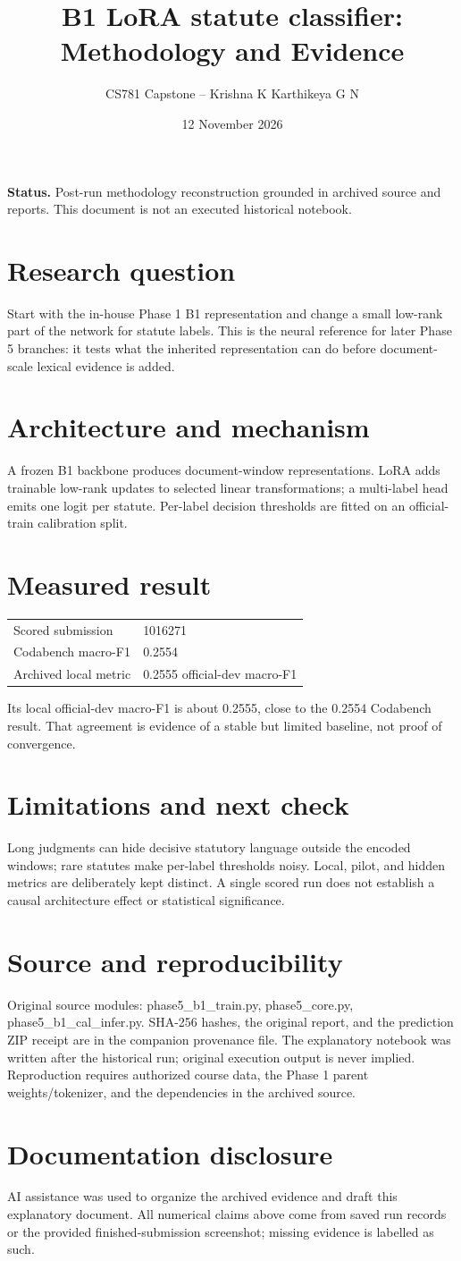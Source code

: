 \documentclass[11pt,a4paper]{article}
\title{B1 LoRA statute classifier: Methodology and Evidence}
\author{CS781 Capstone -- Krishna K Karthikeya G N}
\date{12 November 2026}
\begin{document}
\maketitle
\noindent\textbf{Status.} Post-run methodology reconstruction grounded in archived source and reports. This document is not an executed historical notebook.\par
\section*{Research question}
Start with the in-house Phase 1 B1 representation and change a small low-rank part of the network for statute labels. This is the neural reference for later Phase 5 branches: it tests what the inherited representation can do before document-scale lexical evidence is added.
\section*{Architecture and mechanism}
A frozen B1 backbone produces document-window representations. LoRA adds trainable low-rank updates to selected linear transformations; a multi-label head emits one logit per statute. Per-label decision thresholds are fitted on an official-train calibration split.
\section*{Measured result}
\begin{center}\begin{tabular}{ll}Scored submission & 1016271\\
Codabench macro-F1 & 0.2554\\
Archived local metric & 0.2555 official-dev macro-F1\end{tabular}\end{center}
Its local official-dev macro-F1 is about 0.2555, close to the 0.2554 Codabench result. That agreement is evidence of a stable but limited baseline, not proof of convergence.
\section*{Limitations and next check}
Long judgments can hide decisive statutory language outside the encoded windows; rare statutes make per-label thresholds noisy. Local, pilot, and hidden metrics are deliberately kept distinct. A single scored run does not establish a causal architecture effect or statistical significance.
\section*{Source and reproducibility}
Original source modules: phase5\_b1\_train.py, phase5\_core.py, phase5\_b1\_cal\_infer.py. SHA-256 hashes, the original report, and the prediction ZIP receipt are in the companion provenance file. The explanatory notebook was written after the historical run; original execution output is never implied. Reproduction requires authorized course data, the Phase 1 parent weights/tokenizer, and the dependencies in the archived source.
\section*{Documentation disclosure}
AI assistance was used to organize the archived evidence and draft this explanatory document. All numerical claims above come from saved run records or the provided finished-submission screenshot; missing evidence is labelled as such.
\end{document}
